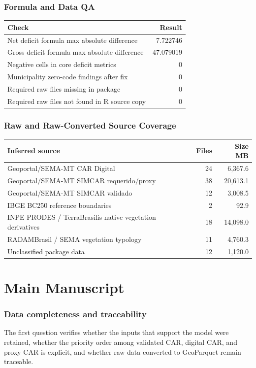\documentclass[12pt]{article}
\begin{document}
\section*{Formula and Data QA}
\begin{tabular}{lr}
\toprule
Check & Result \\
\midrule
Net deficit formula max absolute difference & 7.722746 \\
Gross deficit formula max absolute difference & 47.079019 \\
Negative cells in core deficit metrics & 0 \\
Municipality zero-code findings after fix & 0 \\
Required raw files missing in package & 0 \\
Required raw files not found in R source copy & 0 \\
\bottomrule
\end{tabular}

\section*{Raw and Raw-Converted Source Coverage}
\begin{tabular}{lrr}
\toprule
Inferred source & Files & Size MB \\
\midrule
Geoportal/SEMA-MT CAR Digital & 24 & 6,367.6 \\
Geoportal/SEMA-MT SIMCAR requerido/proxy & 38 & 20,613.1 \\
Geoportal/SEMA-MT SIMCAR validado & 12 & 3,008.5 \\
IBGE BC250 reference boundaries & 2 & 92.9 \\
INPE PRODES / TerraBrasilis native vegetation derivatives & 18 & 14,098.0 \\
RADAMBrasil / SEMA vegetation typology & 11 & 4,760.3 \\
Unclassified package data & 12 & 1,120.0 \\
\bottomrule
\end{tabular}

\part*{Main Manuscript}

\section*{Data completeness and traceability}

The first question verifies whether the inputs that support the model were retained, whether the priority order among validated CAR, digital CAR, and proxy CAR is explicit, and whether raw data converted to GeoParquet remain traceable.
\end{document}
